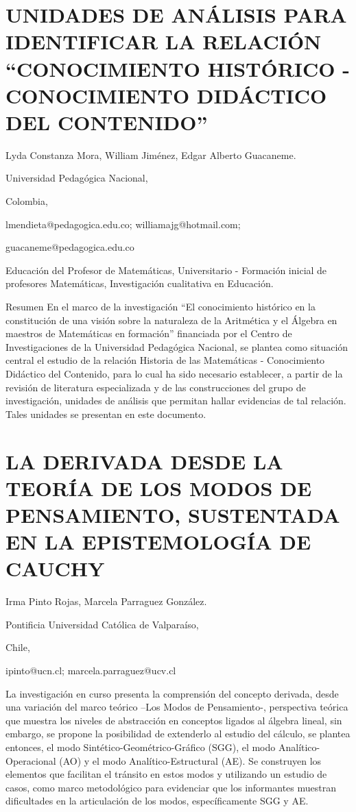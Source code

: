 \section{UNIDADES DE ANÁLISIS PARA IDENTIFICAR LA RELACIÓN “CONOCIMIENTO HISTÓRICO
- CONOCIMIENTO DIDÁCTICO DEL CONTENIDO”}

\begin{datos}

Lyda Constanza Mora, William Jiménez, Edgar Alberto Guacaneme.

Universidad Pedagógica Nacional,

Colombia,

lmendieta@pedagogica.edu.co; williamajg@hotmail.com; 

guacaneme@pedagogica.edu.co

\end{datos}

Educación del Profesor de Matemáticas, Universitario - Formación inicial
de profesores Matemáticas, Investigación cualitativa en Educación.

Resumen En el marco de la investigación “El conocimiento histórico
en la constitución de una visión sobre la naturaleza de la Aritmética
y el Álgebra en maestros de Matemáticas en formación” financiada por
el Centro de Investigaciones de la Universidad Pedagógica Nacional,
se plantea como situación central el estudio de la relación Historia
de las Matemáticas - Conocimiento Didáctico del Contenido, para lo
cual ha sido necesario establecer, a partir de la revisión de literatura
especializada y de las construcciones del grupo de investigación,
unidades de análisis que permitan hallar evidencias de tal relación.
Tales unidades se presentan en este documento.


\section{LA DERIVADA DESDE LA TEORÍA DE LOS MODOS DE PENSAMIENTO, SUSTENTADA
EN LA EPISTEMOLOGÍA DE CAUCHY }

\begin{datos}

Irma Pinto Rojas, Marcela Parraguez González.

Pontificia Universidad Católica de Valparaíso,

Chile,

ipinto@ucn.cl; marcela.parraguez@ucv.cl 

\end{datos}

La investigación en curso presenta la comprensión del concepto derivada,
desde una variación del marco teórico –Los Modos de Pensamiento-,
perspectiva teórica que muestra los niveles de abstracción en conceptos
ligados al álgebra lineal, sin embargo, se propone la posibilidad
de extenderlo al estudio del cálculo, se plantea entonces, el modo
Sintético-Geométrico-Gráfico (SGG), el modo Analítico-Operacional
(AO) y el modo Analítico-Estructural (AE). Se construyen los elementos
que facilitan el tránsito en estos modos y utilizando un estudio de
casos, como marco metodológico para evidenciar que los informantes
muestran dificultades en la articulación de los modos, específicamente
SGG y AE.


